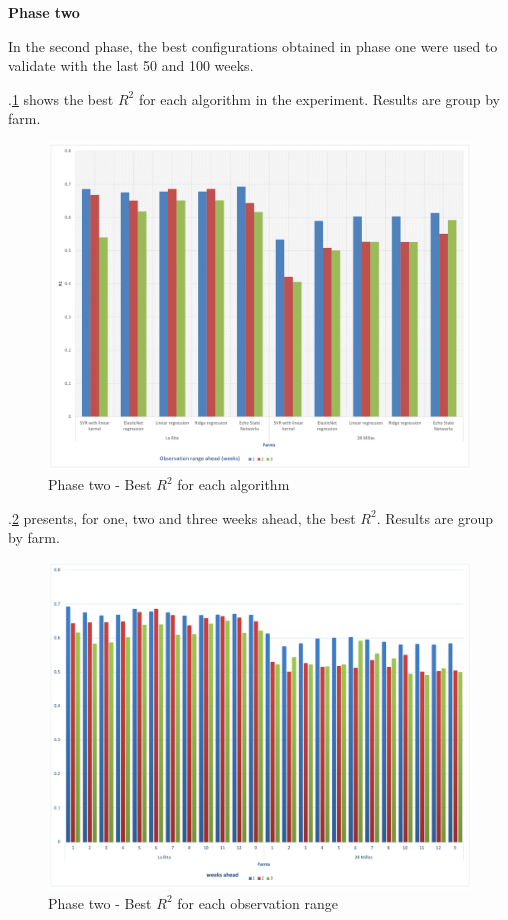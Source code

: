 \documentclass[review]{elsarticle}
\begin{document}
{\bf Phase two }

In the second phase, the best configurations obtained in phase one were used to validate with the last 50 and 100 weeks. 


\figurename $.$\ref{figura8} shows the best $R^2$ for each algorithm in the experiment. Results are group by farm.

\begin{figure}[H] 
 \centering
 \includegraphics[scale=.5]{Phase_two_Best_R2_for_each_algortihm}
 \caption{Phase two - Best $R^2$ for each algorithm} 
 \label{figura8} 
\end{figure}

\figurename $.$\ref{figura9} presents, for one, two and three weeks ahead, the best $R^2$. Results are group by farm.

\begin{figure}[H] 
 \centering
 \includegraphics[scale=.5]{Phase_two_Best_R2_for_each_number_of_observation_range_in_the_patterm}
 \caption{Phase two - Best $R^2$ for each observation range} 
 \label{figura9} 
\end{figure}
\end{document}
